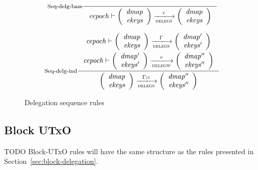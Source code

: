 \documentclass[11pt,a4paper]{article}
\newenvironment{todo}
  {\begin{bclogo}[logo=\bcoutil, couleur=red!5, couleurBarre=red, arrondi=0.2]{ TODO}}
    {\end{bclogo}}
\newcommand{\var}[1]{\mathit{#1}}
\newcommand{\trans}[2]{\xlongrightarrow[\textsc{#1}]{#2}}
\begin{document}
\begin{figure}
  \begin{equation}
    \inference[Seq-delg-base]
    {}
    { \var{cepoch} \vdash \left(
        \begin{array}{r}
          \var{dmap}\\
          \var{ekeys}
        \end{array}
      \right)
        \trans{delegs}{\epsilon}
      \left(
        \begin{array}{r}
          \var{dmap}\\
          \var{ekeys}
        \end{array}
      \right)
    }
    \label{eq:rule:sequence-delegation-base}
  \end{equation}

  \begin{equation}
    \inference[Seq-delg-ind]
    { \var{cepoch} \vdash
      {\left(
        \begin{array}{r}
          \var{dmap}\\
          \var{ekeys}
        \end{array}
      \right)}
      \trans{delegs}{\Gamma}
      {\left(
        \begin{array}{r}
          \var{dmap'}\\
          \var{ekeys'}
        \end{array}
      \right)}
    \\ ~ \\
    \var{cepoch} \vdash
    {\left(
        \begin{array}{r}
          \var{dmap'}\\
          \var{ekeys'}
        \end{array}
      \right)}
      \trans{delegw}{c}
      {\left(
        \begin{array}{r}
          \var{dmap''}\\
          \var{ekeys''}
        \end{array}
      \right)}
    }
    { \left(
        \begin{array}{r}
          \var{dmap}\\
          \var{ekeys}
        \end{array}
      \right)
      \trans{delegs}{\Gamma; c}
      \left(
        \begin{array}{r}
          \var{dmap''}\\
          \var{ekeys''}
        \end{array}
      \right)
    }
    \label{eq:rule:sequence-delegation-inductive}
  \end{equation}
  \caption{Delegation sequence rules}
  \label{fig:delegation-sequence-rules}
\end{figure}

\subsection{Block UTxO}
\label{sec:block-utxo}


\begin{todo}
  Block-UTxO rules will have the same structure as the rules presented in
  Section~\ref{sec:block-delegation}.
\end{todo}
\end{document}
